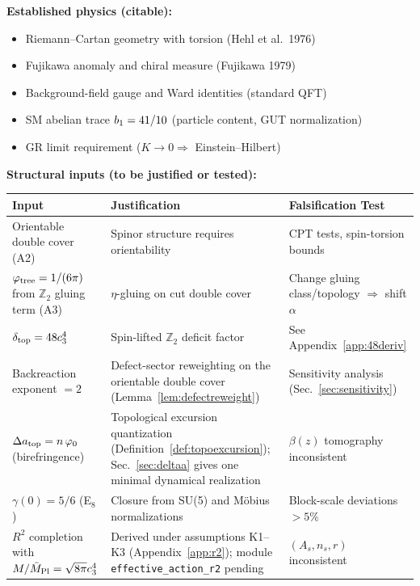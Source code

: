 \vspace{0.5em}
\begin{tcolorbox}[colback=yellow!5, colframe=yellow!60!black, 
    title={\textbf{Assumption Ledger: Established vs.\ New}}, fonttitle=\bfseries]

\textbf{Established physics (citable):}
\begin{itemize}[leftmargin=1.5em, topsep=2pt, itemsep=1pt]
    \item Riemann--Cartan geometry with torsion (Hehl et al.~1976)
    \item Fujikawa anomaly and chiral measure (Fujikawa 1979)
    \item Background-field gauge and Ward identities (standard QFT)
    \item SM abelian trace $b_1 = 41/10$ (particle content, GUT normalization)
    \item GR limit requirement ($K \to 0 \Rightarrow$ Einstein--Hilbert)
\end{itemize}

\textbf{Structural inputs (to be justified or tested):}
\begin{center}
\begin{tabular}{@{}p{4cm}p{4cm}p{4.5cm}@{}}
\toprule
\textbf{Input} & \textbf{Justification} & \textbf{Falsification Test}\\
\midrule
Orientable double cover (A2) & Spinor structure requires orientability & CPT tests, spin-torsion bounds\\
$\varphi_{\mathrm{tree}} = 1/(6\pi)$ from $\mathbb{Z}_2$ gluing term (A3) & $\eta$-gluing on cut double cover & Change gluing class/topology $\Rightarrow$ shift $\alpha$\\
$\delta_{\mathrm{top}} = 48c_3^4$ & Spin-lifted $\mathbb{Z}_2$ deficit factor & See Appendix~\ref{app:48deriv}\\
Backreaction exponent $=2$ & Defect-sector reweighting on the orientable double cover (Lemma~\ref{lem:defectreweight}) & Sensitivity analysis (Sec.~\ref{sec:sensitivity})\\
$\Delta a_{\text{top}} = n\,\varphi_0$ (birefringence) & Topological excursion quantization (Definition~\ref{def:topoexcursion}); Sec.~\ref{sec:deltaa} gives one minimal dynamical realization & $\beta(z)$ tomography inconsistent\\
$\gamma(0) = 5/6$ (E$_8$) & Closure from SU(5) and M\"obius normalizations & Block-scale deviations $>5\%$\\
$R^2$ completion with $M/\bar{M}_{\mathrm{Pl}}=\sqrt{8\pi}c_3^4$ & Derived under assumptions K1--K3 (Appendix~\ref{app:r2}); module \texttt{effective\_action\_r2} pending & $(A_s,n_s,r)$ inconsistent\\
\bottomrule
\end{tabular}
\end{center}


\end{tcolorbox}
